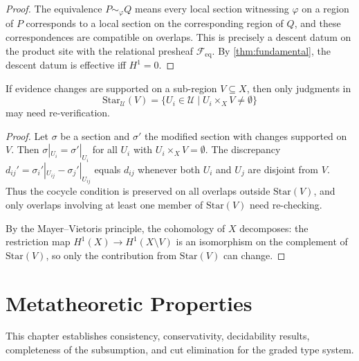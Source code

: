 \begin{proof}
The equivalence $P \sim_\varphi Q$ means every local section
witnessing $\varphi$ on a region of $P$ corresponds to a local
section on the corresponding region of $Q$, and these correspondences
are compatible on overlaps.  This is precisely a descent datum on the
product site with the relational presheaf $\mathcal{F}_{\mathrm{eq}}$.
By \cref{thm:fundamental}, the descent datum is effective iff
$H^1 = 0$.
\end{proof}

\begin{proposition}
\label{prop:support-local}
If evidence changes are supported on a sub-region $V \subseteq X$,
then only judgments in
\[
  \mathrm{Star}_{\mathcal{U}}(V) = \{U_i \in \mathcal{U}
  \mid U_i \times_X V \neq \emptyset\}
\]
may need re-verification.
\end{proposition}

\begin{proof}
Let $\sigma$ be a section and $\sigma'$ the modified section with
changes supported on~$V$.  Then $\sigma|_{U_i} = \sigma'|_{U_i}$ for
all $U_i$ with $U_i \times_X V = \emptyset$.  The discrepancy
$d_{ij}' = \sigma_i'|_{U_{ij}} - \sigma_j'|_{U_{ij}}$ equals
$d_{ij}$ whenever both $U_i$ and $U_j$ are disjoint from $V$.  Thus
the cocycle condition is preserved on all overlaps outside
$\mathrm{Star}(V)$, and only overlaps involving at least one member
of $\mathrm{Star}(V)$ need re-checking.

By the Mayer--Vietoris principle, the cohomology of $X$ decomposes:
the restriction map $H^1(X) \to H^1(X \setminus V)$ is an isomorphism
on the complement of $\mathrm{Star}(V)$, so only the contribution
from $\mathrm{Star}(V)$ can change.
\end{proof}

\chapter{Metatheoretic Properties}
\label{ch:metatheory}

This chapter establishes consistency, conservativity, decidability
results, completeness of the subsumption, and cut elimination for
the graded type system.

